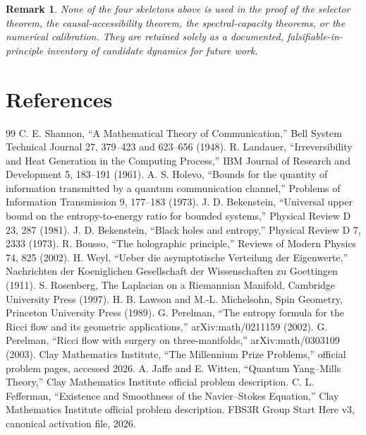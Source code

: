 \documentclass[11pt,a4paper]{article}
\newtheorem{remark}[theorem]{Remark}
\begin{document}
\begin{remark}
None of the four skeletons above is used in the proof of the selector theorem, the causal-accessibility theorem, the spectral-capacity theorems, or the numerical calibration.  They are retained solely as a documented, falsifiable-in-principle inventory of candidate dynamics for future work.
\end{remark}

\section{References}
\begin{thebibliography}{99}
 C. E. Shannon, ``A Mathematical Theory of Communication,'' Bell System Technical Journal 27, 379--423 and 623--656 (1948).
 R. Landauer, ``Irreversibility and Heat Generation in the Computing Process,'' IBM Journal of Research and Development 5, 183--191 (1961).
 A. S. Holevo, ``Bounds for the quantity of information transmitted by a quantum communication channel,'' Problems of Information Transmission 9, 177--183 (1973).
 J. D. Bekenstein, ``Universal upper bound on the entropy-to-energy ratio for bounded systems,'' Physical Review D 23, 287 (1981).
 J. D. Bekenstein, ``Black holes and entropy,'' Physical Review D 7, 2333 (1973).
 R. Bousso, ``The holographic principle,'' Reviews of Modern Physics 74, 825 (2002).
 H. Weyl, ``Ueber die asymptotische Verteilung der Eigenwerte,'' Nachrichten der Koeniglichen Gesellschaft der Wissenschaften zu Goettingen (1911).
 S. Rosenberg, The Laplacian on a Riemannian Manifold, Cambridge University Press (1997).
 H. B. Lawson and M.-L. Michelsohn, Spin Geometry, Princeton University Press (1989).
 G. Perelman, ``The entropy formula for the Ricci flow and its geometric applications,'' arXiv:math/0211159 (2002).
 G. Perelman, ``Ricci flow with surgery on three-manifolds,'' arXiv:math/0303109 (2003).
 Clay Mathematics Institute, ``The Millennium Prize Problems,'' official problem pages, accessed 2026.
 A. Jaffe and E. Witten, ``Quantum Yang--Mills Theory,'' Clay Mathematics Institute official problem description.
 C. L. Fefferman, ``Existence and Smoothness of the Navier--Stokes Equation,'' Clay Mathematics Institute official problem description.
 FBS3R Group Start Here v3, canonical activation file, 2026.

\end{thebibliography}
\end{document}
